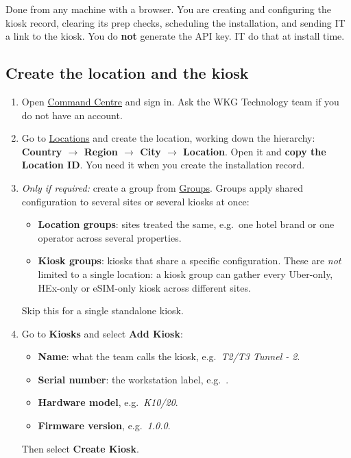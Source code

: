 \documentclass[a4paper,10pt]{article}
\begin{document}
Done from any machine with a browser. You are creating and configuring the
kiosk record, clearing its prep checks, scheduling the installation, and
sending IT a link to the kiosk. You do \textbf{not} generate the API key.
IT do that at install time.

\subsection{Create the location and the kiosk}

\begin{enumerate}
  \item Open \href{https://command.weknow.technology}{Command Centre}
        and sign in. Ask the WKG Technology team if you do not have an
        account.

  \item Go to \href{https://command.weknow.technology/locations}{Locations}
        and create the location, working down the hierarchy:
        \textbf{Country $\rightarrow$ Region $\rightarrow$ City
        $\rightarrow$ Location}. Open it and \textbf{copy the Location
        ID}. You need it when you create the installation record.
\end{enumerate}


\begin{enumerate}\setcounter{enumi}{2}
  \item \emph{Only if required:} create a group from
        \href{https://command.weknow.technology/groups}{Groups}. Groups
        apply shared configuration to several sites or several kiosks at
        once:
    \begin{itemize}
      \item \textbf{Location groups}: sites treated the same, e.g.\ one
            hotel brand or one operator across several properties.
      \item \textbf{Kiosk groups}: kiosks that share a specific
            configuration. These are \emph{not} limited to a single
            location: a kiosk group can gather every Uber-only, HEx-only
            or eSIM-only kiosk across different sites.
    \end{itemize}
    Skip this for a single standalone kiosk.

  \item Go to \textbf{Kiosks} and select \textbf{Add Kiosk}:
    \begin{itemize}
      \item \textbf{Name}: what the team calls the kiosk,
            e.g.\ \emph{T2/T3 Tunnel - 2}.
      \item \textbf{Serial number}: the workstation label,
            e.g.\ .
      \item \textbf{Hardware model}, e.g.\ \emph{K10/20}.
      \item \textbf{Firmware version}, e.g.\ \emph{1.0.0}.
    \end{itemize}
    Then select \textbf{Create Kiosk}.
\end{enumerate}
\end{document}
